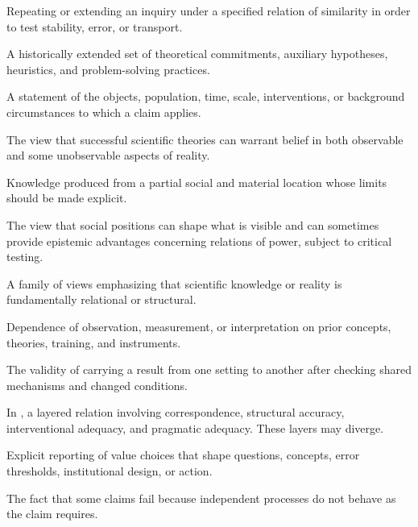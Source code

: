 \begin{description}[style=nextline,leftmargin=0pt,labelindent=0pt,labelwidth=0pt]
\item[Replication.] Repeating or extending an inquiry under a specified relation
of similarity in order to test stability, error, or transport.

\item[Research programme.] A historically extended set of theoretical
commitments, auxiliary hypotheses, heuristics, and problem-solving practices.

\item[Scope condition.] A statement of the objects, population, time, scale,
interventions, or background circumstances to which a claim applies.

\item[Scientific realism.] The view that successful scientific theories can
warrant belief in both observable and some unobservable aspects of reality.

\item[Situated knowledge.] Knowledge produced from a partial social and material
location whose limits should be made explicit.

\item[Standpoint theory.] The view that social positions can shape what is
visible and can sometimes provide epistemic advantages concerning relations of
power, subject to critical testing.

\item[Structural realism.] A family of views emphasizing that scientific
knowledge or reality is fundamentally relational or structural.

\item[Theory-ladenness.] Dependence of observation, measurement, or
interpretation on prior concepts, theories, training, and instruments.

\item[Transportability.] The validity of carrying a result from one setting to
another after checking shared mechanisms and changed conditions.

\item[Truth.] In \RCR, a layered relation involving correspondence, structural
accuracy, interventional adequacy, and pragmatic adequacy. These layers may
diverge.

\item[Value transparency.] Explicit reporting of value choices that shape
questions, concepts, error thresholds, institutional design, or action.

\item[World resistance.] The fact that some claims fail because independent
processes do not behave as the claim requires.
\end{description}

